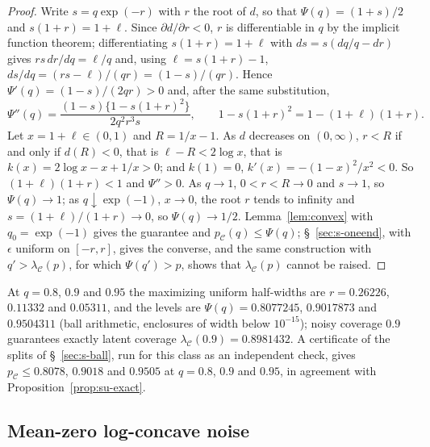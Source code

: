 \documentclass[12pt]{article}
\renewcommand{\_}{\usc\allowbreak}
\theoremstyle{definition}
\numberwithin{equation}{section}
\newcommand{\E}{\mathcal{C}}
\begin{document}
\begin{proof}
Write $s = q\exp(-r)$ with $r$ the root of $d$, so that $\Psi(q) = (1 + s)/2$ and $s(1 + r) = 1 + \ell$. Since $\partial d/\partial r < 0$, $r$ is differentiable in $q$ by the implicit function theorem; differentiating $s(1 + r) = 1 + \ell$ with $ds = s(dq/q - dr)$ gives $rs\,dr/dq = \ell/q$ and, using $\ell = s(1 + r) - 1$, $ds/dq = (rs - \ell)/(qr) = (1 - s)/(qr)$. Hence $\Psi'(q) = (1 - s)/(2qr) > 0$ and, after the same substitution,
\[
\Psi''(q) = \frac{(1 - s)\{1 - s(1 + r)^2\}}{2q^2r^3s}, \qquad 1 - s(1 + r)^2 = 1 - (1 + \ell)(1 + r).
\]
Let $x = 1 + \ell \in (0, 1)$ and $R = 1/x - 1$. As $d$ decreases on $(0, \infty)$, $r < R$ if and only if $d(R) < 0$, that is $\ell - R < 2\log x$, that is $k(x) = 2\log x - x + 1/x > 0$; and $k(1) = 0$, $k'(x) = -(1 - x)^2/x^2 < 0$. So $(1 + \ell)(1 + r) < 1$ and $\Psi'' > 0$. As $q \to 1$, $0 < r < R \to 0$ and $s \to 1$, so $\Psi(q) \to 1$; as $q \downarrow \exp(-1)$, $x \to 0$, the root $r$ tends to infinity and $s = (1 + \ell)/(1 + r) \to 0$, so $\Psi(q) \to 1/2$. Lemma~\ref{lem:convex} with $q_0 = \exp(-1)$ gives the guarantee and $p_{\E}(q) \le \Psi(q)$; \S~\ref{sec:s-oneend}, with $\epsilon$ uniform on $[-r, r]$, gives the converse, and the same construction with $q' > \lambda_{\E}(p)$, for which $\Psi(q') > p$, shows that $\lambda_{\E}(p)$ cannot be raised.
\end{proof}

At $q = 0.8$, $0.9$ and $0.95$ the maximizing uniform half-widths are $r = 0.26226$, $0.11332$ and $0.05311$, and the levels are $\Psi(q) = 0.8077245$, $0.9017873$ and $0.9504311$ (ball arithmetic, enclosures of width below $10^{-15}$); noisy coverage $0.9$ guarantees exactly latent coverage $\lambda_{\E}(0.9) = 0.8981432$. A certificate of the splits of \S~\ref{sec:s-ball}, run for this class as an independent check, gives $p_{\E} \le 0.8078$, $0.9018$ and $0.9505$ at $q = 0.8$, $0.9$ and $0.95$, in agreement with Proposition~\ref{prop:su-exact}.

\subsection{Mean-zero log-concave noise}\label{sec:s-lc}
\end{document}
